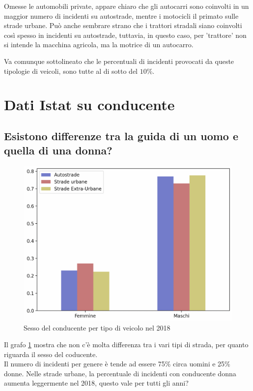 \documentclass[a4paper]{report}
\begin{document}
Omesse le automobili private, appare chiaro che gli autocarri sono coinvolti in un maggior 
numero di incidenti su autostrade, mentre i motocicli il primato sulle strade urbane.
Può anche sembrare strano che i trattori stradali siano coinvolti così spesso in incidenti 
su autostrade, tuttavia, in questo caso, per 'trattore' non si intende la macchina 
agricola, ma la motrice di un autocarro.

Va comunque sottolineato che le percentuali di incidenti provocati da queste tipologie di 
veicoli, sono tutte al di sotto del $10$\%.

\section{Dati Istat su conducente}

\subsection{Esistono differenze tra la guida di un uomo e quella di una donna?}

\begin{figure}
    \includegraphics[width=\linewidth]{../src/incidenti/incidenti_senza_coords/tipo_veicoli/uomo-donna.png}
    \caption{Sesso del conducente per tipo di veicolo nel 2018}
    \label{fig:differenza-uomo-donna}
\end{figure}

Il grafo \ref{fig:differenza-uomo-donna} mostra che non c'è molta differenza tra i vari tipi di 
strada, per quanto riguarda il sesso del coducente.\\
Il numero di incidenti per genere è tende ad essere 75\% circa uomini e 25\% donne.
Nelle strade  urbane, la percentuale di incidenti con conducente donna aumenta leggermente nel 2018, 
questo vale per tutti gli anni?
\end{document}
